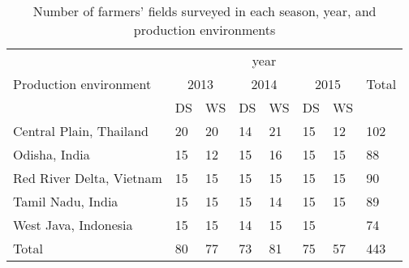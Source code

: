 \begin{table}[!h]
\centering
    \begin{tabular}{llllllll}
    \hline
    \multirow{3}{*}{Production environment} & \multicolumn{6}{c}{year} & \multirow{3}{*}{Total} \\ \cline{2-7}
                         & \multicolumn{2}{c}{2013} & \multicolumn{2}{c}{2014} & \multicolumn{2}{c}{2015} &     \\ \cline{2-7}
                         & DS         & WS         & DS          & WS         & DS          & WS         &     \\
                        \hline
        Central Plain, Thailand           &20          & 20          & 14          &21          &15           &12            & 102  \\
        Odisha, India                     &15            & 12          & 15          & 16         & 15          & 15           & 88  \\
        Red River Delta, Vietnam                   &15            & 15          & 15          & 15           & 15            & 15           & 90   \\
        Tamil Nadu, India                 &15            & 15          &  15           & 14         & 15            & 15         & 89  \\
        West Java, Indonesia              & 15           & 15          &   14          & 15         & 15          &            & 74   \\
                        \hline
        Total           & 80          & 77         & 73         & 81         & 75          & 57         & 443   \\
        \hline               
    \end{tabular}
    \caption{Number of farmers' fields surveyed in each season, year, and production environments}
    \label{table:Survey_data}
\end{table}